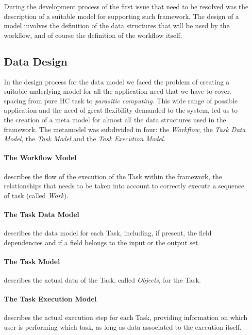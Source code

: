 
During the development process of \myTitle the first issue that need to be
resolved was the description of a suitable model for supporting such framework.
The design of a model involves the definition of the data structures that will
be used by the workflow, and of course the definition of the workflow itself.

\subsection{Data Design}
In the design process for the data model we faced the problem of creating a
suitable underlying model for all the application need that we have to cover,
spacing from pure \acl{HC} task to \emph{parasitic computing}. This wide range
of possible application and the need of great flexibility demanded to the system,
led us to the creation of a meta model for almost all the data structures used in
the framework. The metamodel was subdivided in four: the \emph{Workflow}, the
\emph{Task Data Model}, the \emph{Task Model} and the \emph{Task Execution Model}.

\paragraph{The Workflow Model} describes the flow of the execution of the Task
within the framework, the relationships that needs to be taken into account to
correctly execute a sequence of task (called \emph{Work}).

\paragraph{The Task Data Model} describes the data model for each Task, including,
if present, the field dependencies and if a field belongs to the input or the
output set.

\paragraph{The Task Model} describes the actual data of the Task, called
\emph{Objects}, for the Task.

\paragraph{The Task Execution Model} describes the actual execution step for
each Task, providing information on which user is performing which task, as long
as data associated to the execution itself.



